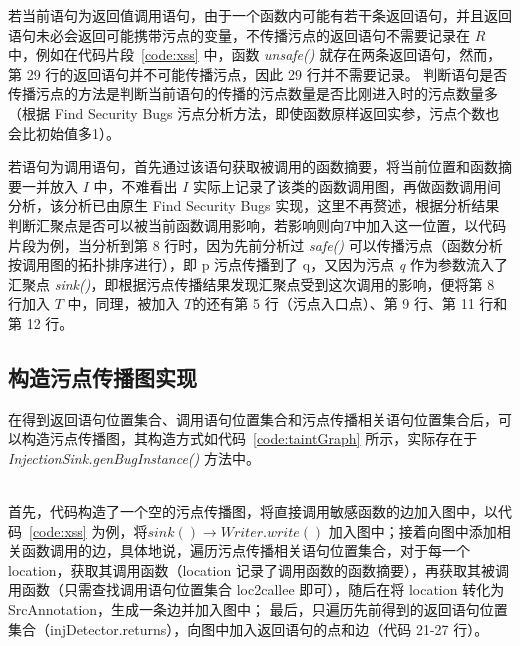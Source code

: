 若当前语句为返回值调用语句，由于一个函数内可能有若干条返回语句，并且返回语句未必会返回可能携带污点的变量，不传播污点的返回语句不需要记录在 $R$ 中，例如在代码片段~\ref{code:xss} 中，函数 \textit{unsafe()} 就存在两条返回语句，然而，第 29 行的返回语句并不可能传播污点，因此 29 行并不需要记录。 判断语句是否传播污点的方法是判断当前语句的传播的污点数量是否比刚进入时的污点数量多（根据 Find Security Bugs 污点分析方法，即使函数原样返回实参，污点个数也会比初始值多1）。

若语句为调用语句，首先通过该语句获取被调用的函数摘要，将当前位置和函数摘要一并放入 $I$ 中，不难看出 $I$ 实际上记录了该类的函数调用图，再做函数调用间分析，该分析已由原生 Find Security Bugs 实现，这里不再赘述，根据分析结果判断汇聚点是否可以被当前函数调用影响，若影响则向$T$中加入这一位置，以代码片段为例，当分析到第 8 行时，因为先前分析过 \textit{safe()} 可以传播污点（函数分析按调用图的拓扑排序进行），即 p 污点传播到了 q，又因为污点 \textit{q} 作为参数流入了汇聚点 \textit{sink()}，即根据污点传播结果发现汇聚点受到这次调用的影响，便将第 8 行加入 $T$ 中，同理，被加入 $T$的还有第 5 行（污点入口点）、第 9 行、第 11 行和第 12 行。\\



\subsection{构造污点传播图实现}
在得到返回语句位置集合、调用语句位置集合和污点传播相关语句位置集合后，可以构造污点传播图，其构造方式如代码~\ref{code:taintGraph} 所示，实际存在于 \textit{InjectionSink.genBugInstance()} 方法中。

\begin{minipage}[!htbp]{0.9\textwidth}
    
\end{minipage}\\

首先，代码构造了一个空的污点传播图，将直接调用敏感函数的边加入图中，以代码~\ref{code:xss} 为例，将$sink() \rightarrow Writer.write()$ 加入图中；接着向图中添加相关函数调用的边，具体地说，遍历污点传播相关语句位置集合，对于每一个 location，获取其调用函数（location 记录了调用函数的函数摘要），再获取其被调用函数（只需查找调用语句位置集合 loc2callee 即可），随后在将 location 转化为 SrcAnnotation，生成一条边并加入图中； 最后，只遍历先前得到的返回语句位置集合（injDetector.returns），向图中加入返回语句的点和边（代码 21-27 行）。\\

